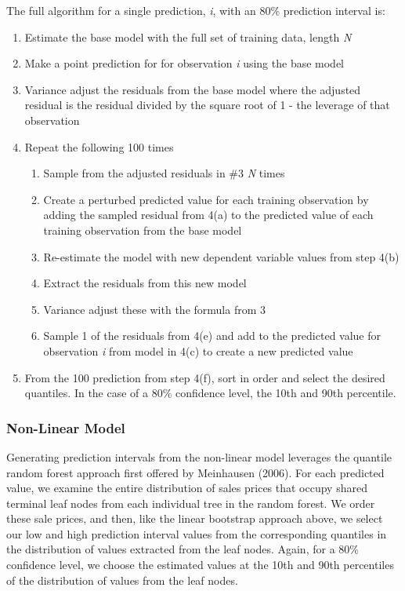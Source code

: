 \documentclass[colTwo]{format}
\theoremstyle{definition}
\begin{document}
The full algorithm for a single prediction, \textit{i}, with an 80\% prediction interval is:
\begin{enumerate}
\item Estimate the base model with the full set of training data, length \textit{N}
\item Make a point prediction for for observation \textit{i} using the base model
\item Variance adjust the residuals from the base model where the adjusted residual is the residual divided by the square root of 1 - the leverage of that observation
\item Repeat the following 100 times
\begin{enumerate}
\item Sample from the adjusted residuals in \#3 \textit{N} times
\item Create a perturbed predicted value for each training observation by adding the sampled residual from 4(a) to the predicted value of each training observation from the base model
\item Re-estimate the model with new dependent variable values from step 4(b)
\item Extract the residuals from this new model
\item Variance adjust these with the formula from 3
\item Sample 1 of the residuals from 4(e) and add to the predicted value for observation \textit{i} from model in 4(c) to create a new predicted value
\end{enumerate}
\item From the 100 prediction from step 4(f), sort in order and select the desired quantiles.  In the case of a 80\% confidence level, the 10th and 90th percentile. 
\end{enumerate}

\subsubsection{Non-Linear Model}

Generating prediction intervals from the non-linear model leverages the quantile random forest approach first offered by Meinhausen (2006).  For each predicted value, we examine the entire distribution of sales prices that occupy shared terminal leaf nodes from each individual tree in the random forest.  We order these sale prices, and then, like the linear bootstrap approach above, we select our low and high prediction interval values from the corresponding quantiles in the distribution of values extracted from the leaf nodes. Again, for a 80\% confidence level, we choose the estimated values at the 10th and 90th percentiles of the distribution of values from the leaf nodes. 
\end{document}
